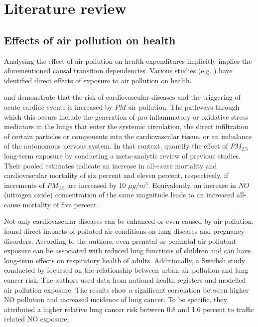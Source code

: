 \documentclass[
]{article}
\begin{document}
	\hypertarget{literature review}{%
		\section{Literature review}\label{Literature review}}
	
	\subsection{Effects of air pollution on health}
	
	Analysing the effect of air pollution on health expenditures implicitly implies the aforementioned causal transition dependencies. Various studies (e.g. \cite{franklin2015air,NYBERG2000,LEL2015}) have identified direct effects of exposure to air pollution on health. 
	
	\cite{franklin2015air} and \cite{fiordelisi2017mechanisms} demonstrate that the risk of cardiovascular diseases and the triggering of acute cardiac events is increased by $PM$ air pollution. The pathways through which this occurs include the generation of pro-inflammatory or oxidative stress mediators in the lungs that enter the systemic circulation, the direct infiltration of certain particles or components into the cardiovascular tissue, or an imbalance of the autonomous nervous system. In that context, \cite{hoek2013long} quantify the effect of $PM_{2.5}$ long-term exposure by conducting a meta-analytic review of previous studies. Their pooled estimates indicate an increase in all-cause mortality and cardiovascular mortality of six percent and eleven percent, respectively, if increments of $PM_{2.5}$ are increased by 10 $\mu g/m^3$. Equivalently, an increase in $NO$ (nitrogen oxide) concentration of the same magnitude leads to an increased all-cause mortality of five percent.  
	
	Not only cardiovascular diseases can be enhanced or even caused by air pollution. \cite{KIM2018} found direct impacts of polluted air conditions on lung diseases and pregnancy disorders. According to the authors, even prenatal or perinatal air pollutant exposure can be associated with reduced lung functions of children and can have long-term effects on respiratory health of adults. Additionally, a Swedish study conducted by \cite{NYBERG2000} focussed on the relationship between urban air pollution and lung cancer risk. The authors used data from national health registers and modelled air pollution exposure. The results show a significant correlation between higher NO pollution and increased incidence of lung cancer. To be specific, they attributed a higher relative lung cancer risk between 0.8 and 1.6 percent to traffic related NO exposure. 
	
\end{document}

